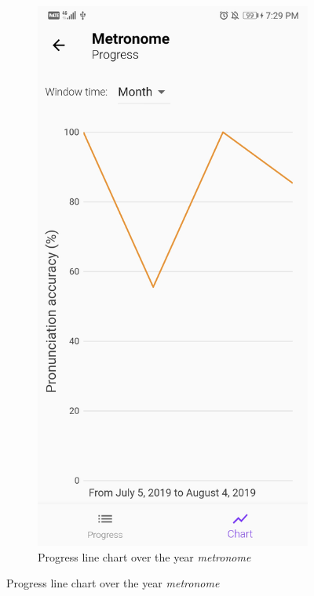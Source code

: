\begin{appendices}
\begin{landscape}
\begin{figure}[h]
\begin{subfigure}{.25\textwidth}
    \includegraphics[width=.75\linewidth]{content/imgs/screen8.jpg}
    \caption{Progress line chart over the year \textit{metronome}}
  \end{subfigure}
\end{figure}



\end{landscape}
\end{appendices}
